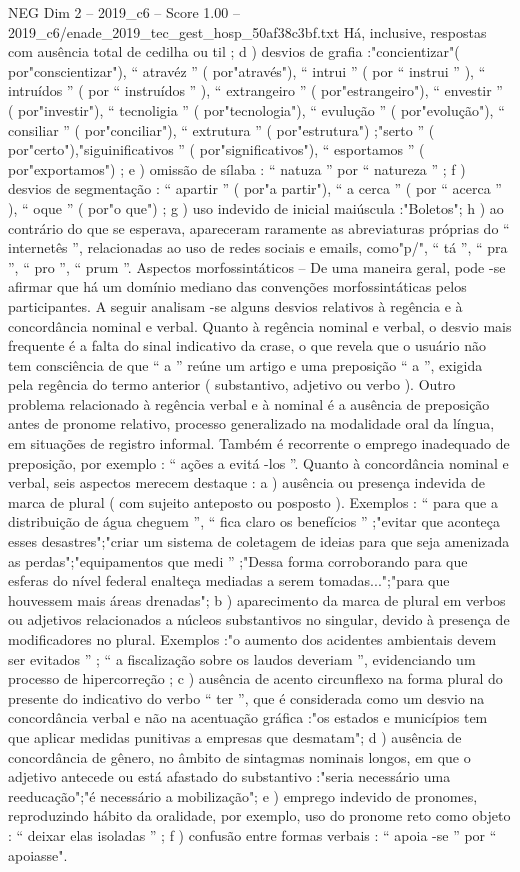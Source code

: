 \begin{textsample}{NEG Dim 2 – 2019\_c6 – Score 1.00 – 2019\_c6/enade\_2019\_tec\_gest\_hosp\_50af38c3bf.txt}
Há, inclusive, respostas com ausência total de cedilha ou til ; d ) desvios de grafia :"concientizar"( por"conscientizar"), “ atravéz ” ( por"através"), “ intrui ” ( por “ instrui ” ), “ intruídos ” ( por “ instruídos ” ), “ extrangeiro ” ( por"estrangeiro"), “ envestir ” ( por"investir"), “ tecnoligia ” ( por"tecnologia"), “ evulução ” ( por"evolução"), “ consiliar ” ( por"conciliar"), “ extrutura ” ( por"estrutura") ;"serto ” ( por"certo"),"siguinificativos ” ( por"significativos"), “ esportamos ” ( por"exportamos") ; e ) omissão de sílaba : “ natuza ” por “ natureza ” ; f ) desvios de segmentação : “ apartir ” ( por"a partir"), “ a cerca ” ( por “ acerca ” ), “ oque ” ( por"o que") ; g ) uso indevido de inicial maiúscula :"Boletos"; h ) ao contrário do que se esperava, apareceram raramente as abreviaturas próprias do “ internetês ”, relacionadas ao uso de redes sociais e emails, como"p/", “ tá ”, “ pra ”, “ pro ”, “ prum ”.
Aspectos morfossintáticos – De uma maneira geral, pode -se afirmar que há um domínio mediano das convenções morfossintáticas pelos participantes.
A seguir analisam -se alguns desvios relativos à regência e à concordância nominal e verbal.
Quanto à regência nominal e verbal, o desvio mais frequente é a falta do sinal indicativo da crase, o que revela que o usuário não tem consciência de que “ a ” reúne um artigo e uma preposição “ a ”, exigida pela regência do termo anterior ( substantivo, adjetivo ou verbo ).
Outro problema relacionado à regência verbal e à nominal é a ausência de preposição antes de pronome relativo, processo generalizado na modalidade oral da língua, em situações de registro informal.
Também é recorrente o emprego inadequado de preposição, por exemplo : “ ações a evitá -los ”.
Quanto à concordância nominal e verbal, seis aspectos merecem destaque : a ) ausência ou presença indevida de marca de plural ( com sujeito anteposto ou posposto ).
Exemplos : “ para que a distribuição de água cheguem ”, “ fica claro os benefícios ” ;"evitar que aconteça esses desastres";"criar um sistema de coletagem de ideias para que seja amenizada as perdas";"equipamentos que medi ” ;"Dessa forma corroborando para que esferas do nível federal enalteça mediadas a serem tomadas...";"para que houvessem mais áreas drenadas"; b ) aparecimento da marca de plural em verbos ou adjetivos relacionados a núcleos substantivos no singular, devido à presença de modificadores no plural.
Exemplos :"o aumento dos acidentes ambientais devem ser evitados ” ; “ a fiscalização sobre os laudos deveriam ”, evidenciando um processo de hipercorreção ; c ) ausência de acento circunflexo na forma plural do presente do indicativo do verbo “ ter ”, que é considerada como um desvio na concordância verbal e não na acentuação gráfica :"os estados e municípios tem que aplicar medidas punitivas a empresas que desmatam"; d ) ausência de concordância de gênero, no âmbito de sintagmas nominais longos, em que o adjetivo antecede ou está afastado do substantivo :"seria necessário uma reeducação";"é necessário a mobilização"; e ) emprego indevido de pronomes, reproduzindo hábito da oralidade, por exemplo, uso do pronome reto como objeto : “ deixar elas isoladas ” ; f ) confusão entre formas verbais : “ apoia -se ” por “ apoiasse".

\end{textsample}
